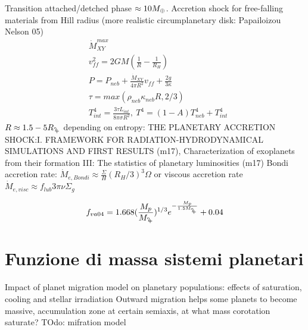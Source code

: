 \begin{workout}
Transition attached/detched phase $\approx10M_{\oplus}{}$.
Accretion shock for free-falling materials from Hill radius (more realistic circumplanetary disk: Papailoizou Nelson 05)
\begin{align}
&\dot{M}_{XY}^{max}\\
&v_{ff}^2=2GM(\frac{1}{R}-\frac{1}{R_H})\\
&P=P_{neb}+\frac{\dot{M}_{XY}}{4\pi R^2}v_{ff}+\frac{2g}{3\kappa}\\
&\tau=max(\rho_{neb}\kappa_{neb}R,2/3)\\
&T^4_{int}=\frac{3\tau L_{int}}{8\pi\sigma R^2},\ T^4=(1-A)T_{neb}^4+T_{int}^4
\end{align}
$R\approx1.5-5\rjupiter{}$ depending on entropy: THE PLANETARY ACCRETION SHOCK:I. FRAMEWORK FOR RADIATION-HYDRODYNAMICAL SIMULATIONS AND FIRST RESULTS (m17), Characterization of exoplanets from their formation III: The statistics of planetary luminosities (m17)
Bondi accretion rate: $\dot{M}_{e, Bondi}\approx\frac{\Sigma}{H}(R_H/3)^3\Omega$ or viscous accretion rate $\dot{M}_{e, visc}\approx f_{lub}3\pi\nu\Sigma_g$
\end{workout}

\begin{workout}
\begin{equation}
f_{va04}=1.668(\frac{M_p}{\mjupiter{}})\expy{1/3}\exp{-\frac{M_p}{1.5\mjupiter{}}}+0.04
\end{equation}
\end{workout}


{\let\clearpage\relax\let\cleardoublepage\relax
\chapter{Funzione di massa sistemi planetari}
}

{Impact of planet migration model on planetary populations: effects of saturation, cooling and stellar irradiation}
Outward migration helps some planets to become massive, accumulation zone at certain semiaxis, at what mass corotation saturate?
TOdo: mifration model
